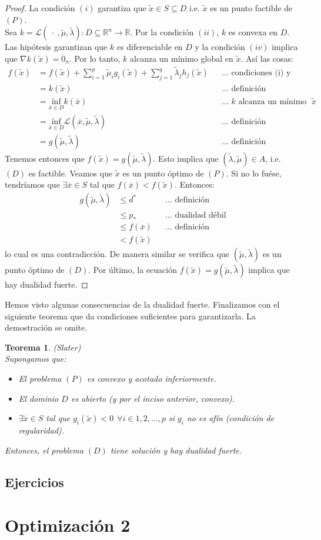 \documentclass[11pt]{report}
\newtheorem{theorem}{Teorema}[section]
\newcommand{\Rn}{\mathbb{R}^{n}}
\newcommand{\R}{\mathbb{R}}
\newcommand{\x}{\overline{x}}
\newcommand{\z}{\overline{0}_{n}}
\newcommand{\Sp}{1,2,\ldots, p}
\newcommand{\La}{\mathcal{L}}
\newcommand{\po}{p_{*}}
\newcommand{\deo}{d^{*}}
\newcommand{\xc}{\widetilde{x}}
\newcommand{\muc}{\widetilde{\mu}}
\newcommand{\lac}{\widetilde{\lambda}}
\begin{document}
\begin{proof}
La condición $(i)$ garantiza que $\xc\in S\subseteq D$ i.e. $\xc$ es un punto factible de $(P)$.\\
Sea $k=\La(\ \cdot\ ,\muc, \lac):D\subseteq\Rn\rightarrow\R$. Por la condición $(ii)$, $k$ es convexa en $D$. Las hipótesis garantizan que $k$ es diferenciable en $D$ y la condición $(iv)$ implica que $\nabla k(\xc)=\z$. Por lo tanto, $k$ alcanza un mínimo global en $\xc$. Así las cosas:
\begin{equation*}
\begin{aligned}
f(\xc)&=f(\xc)+\sum_{i=1}^{p}\muc_{i} g_{i}(\xc) + \sum_{j=1}^{q}\lac_{j} h_{j}(\xc) &&\text{... condiciones (i) y (iii)}\\
&=k(\xc) &&\text{... definición}\\
&= \underset{\x\in D}{\text{ínf}} k(\x) &&\text{... $k$ alcanza un mínimo global en $\xc$} \\
&= \underset{\x\in D}{\text{ínf}}\La(\x,\muc,\lac) &&\text{... definición}\\
&=g(\muc,\lac) &&\text{... definición}
\end{aligned}
\end{equation*}
Tenemos entonces que $f(\xc)=g(\muc,\lac)$. Esto implica que $(\lac,\muc)\in A$, i.e. $(D)$ es factible. Veamos que $\xc$ es un punto óptimo de $(P)$. Si no lo fuése, tendríamos que $\exists\x \in S$ tal que $f(\x)<f(\xc)$. Entonces:
\begin{equation*}
\begin{aligned}
g(\muc,\lac)&\leq\deo &&\text{... definición}\\
&\leq\po &&\text{... dualidad débil}\\
&\leq f(\x) &&\text{... definición}\\
&<f(\xc)
\end{aligned}
\end{equation*}
lo cual es una contradicción. De manera similar se verifica que $(\muc,\lac)$ es un punto óptimo de $(D)$. Por último, la ecuación $f(\xc)=g(\muc,\lac)$ implica que hay dualidad fuerte.
\end{proof}

Hemos visto algunas consecuencias de la dualidad fuerte. Finalizamos con el siguiente teorema que da condiciones suficientes para garantizarla. La demostración se omite.
\begin{theorem}{(Slater)}\\
Supongamos que:
\begin{itemize}
\item[(i)] El problema $(P)$ es convexo y acotado inferiormente.
\item[(ii)] El dominio $D$ es abierto (y por el inciso anterior, convexo).
\item[(iii)] $\exists\widetilde{x}\in S$ tal que $g_{i}(\widetilde{x})<0\ \ \forall i\in\Sp$ si $g_{i}$ no es afín (condición de regularidad).
\end{itemize}
Entonces, el problema $(D)$ tiene solución y hay dualidad fuerte. %
\end{theorem}

\section*{Ejercicios}


\chapter{Optimización 2}
\end{document}
